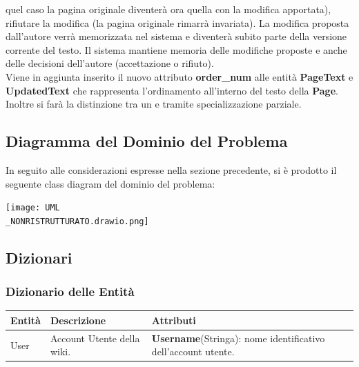 \documentclass{article}
\begin{document}
{{		quel caso la pagina originale diventerà ora quella con la modifica apportata), rifiutare la modifica (la pagina
		originale rimarrà invariata). La modifica proposta dall’autore verrà memorizzata nel sistema e diventerà
		subito parte della versione corrente del testo. Il sistema mantiene memoria delle modifiche proposte e anche
		delle decisioni dell’autore (accettazione o rifiuto).}
	\vspace{0.5cm}
	\\
	Viene in aggiunta inserito il nuovo attributo \textbf{order\_num} alle entità {\textbf {PageText}} e {\textbf {UpdatedText}} che rappresenta l'ordinamento all'interno del testo della {\textbf {Page}}. Inoltre si far\`a la distinzione tra un  e  tramite specializzazione parziale.
	
	\newpage
		
		\subsection{Diagramma del Dominio del Problema}
		In seguito alle considerazioni espresse nella sezione precedente, si è prodotto il seguente class diagram del dominio del problema:
		\begin{center}
			\texttt{[image: UML\\\_NONRISTRUTTURATO.drawio.png]}
		\end{center}
		
		\subsection{Dizionari}
		{\subsubsection{Dizionario delle Entità}}
		
		\begin{table}[H]
			\centering
			\small %
			\setlength{\tabcolsep}{6pt} %
			\renewcommand{\arraystretch}{1.2} %
			
			\begin{tabularx}{\textwidth}{|l|X|X|}
				\hline
				\textbf{Entità} & \textbf{Descrizione} & \textbf{Attributi} \\
				\hline
				User & Account Utente della wiki. & 
				\textbf{Username}(Stringa): nome identificativo dell'account utente.
				

\end{tabularx}
\end{table}}
\end{document}
